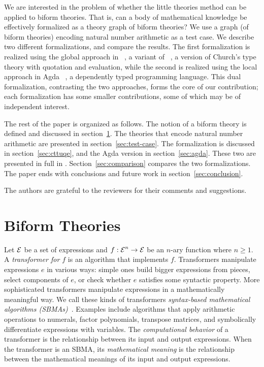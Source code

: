 \documentclass[fleqn]{llncs}
\newcommand{\appendicesref}[2]
  {\iftoggle{cicm}
    {appendices #1 and #2 of \cite{CaretteFarmerArxiv17}}
    {appendices #1 and #2}%
  }
\begin{document}
We are interested in the problem of whether the little theories method
can be applied to biform theories.  That is, can a body of
mathematical knowledge be effectively formalized as a theory graph of
biform theories?  We use a graph (of biform theories) encoding
natural number arithmetic as a test case. We describe
two different formalizations, and compare the
results.  The first formalization is
realized using the global approach in
{\churchuqe}~\cite{FarmerArxiv17}, a variant of
{\churchqe}~\cite{FarmerArxiv16,Farmer16}, a version of Church's type
theory with quotation and evaluation, while the second is realized
using the local approach in Agda~\cite{Norell07,Norell09} , a dependently typed
programming language.  This dual formalization, contrasting the two 
approaches, forms the core of our contribution; each formalization has 
some smaller contributions, some of which may be of independent 
interest.

The rest of the paper is organized as follows.  The notion of a biform
theory is defined and discussed in section~\ref{sec:biform}.  The
theories that encode natural number arithmetic are presented in
section~\ref{sec:test-case}.  The {\churchuqe} formalization is
discussed in section~\ref{sec:cttuqe}, and the Agda version in
section~\ref{sec:agda}.  These two are presented in full in
\appendicesref{A}{B}.  Section~\ref{sec:comparison} compares the two
formalizations.  The paper ends with conclusions and future work in
section~\ref{sec:conclusion}.

The authors are grateful to the reviewers for their comments and
suggestions.

\section{Biform Theories}\label{sec:biform}

Let $\mbox{$\cal E$}$ be a set of expressions and $f : \mbox{$\cal E$}^n \rightarrow \mbox{$\cal E$}$ be an
$n$-ary function where $n \ge 1$.  A \emph{transformer for $f$} is an
algorithm that implements $f$.  Transformers manipulate expressions
$e$ in various ways: simple ones build bigger expressions from pieces,
select components of $e$, or check whether $e$ satisfies some
syntactic property.  More sophisticated transformers manipulate
expressions in a mathematically meaningful way.  We call these kinds
of transformers \emph{syntax-based mathematical algorithms
  (SBMAs)}~\cite{Farmer13}.  Examples include algorithms that apply
arithmetic operations to numerals, factor polynomials, transpose
matrices, and symbolically differentiate expressions with variables.
The \emph{computational behavior} of a transformer is the relationship
between its input and output expressions.  When the transformer is an
SBMA, its \emph{mathematical meaning} is the relationship between the
mathematical meanings of its input and output expressions.
\end{document}
